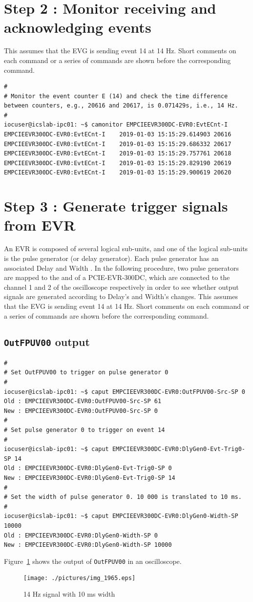 \documentclass[11pt
  , a4paper
  , article
  , oneside
  , showtrims
]{memoir}
\begin{document}
{\section{Step 2 : Monitor receiving and acknowledging events}
This assumes that the EVG is sending event 14 at 14 Hz. Short comments on each command or a series of commands are shown before the corresponding command.
\begin{lstlisting}[style=termstylenumber]
#
# Monitor the event counter E (14) and check the time difference between counters, e.g., 20616 and 20617, is 0.071429s, i.e., 14 Hz.
#
iocuser@icslab-ipc01: ~$ camonitor EMPCIEEVR300DC-EVR0:EvtECnt-I
EMPCIEEVR300DC-EVR0:EvtECnt-I    2019-01-03 15:15:29.614903 20616
EMPCIEEVR300DC-EVR0:EvtECnt-I    2019-01-03 15:15:29.686332 20617
EMPCIEEVR300DC-EVR0:EvtECnt-I    2019-01-03 15:15:29.757761 20618
EMPCIEEVR300DC-EVR0:EvtECnt-I    2019-01-03 15:15:29.829190 20619
EMPCIEEVR300DC-EVR0:EvtECnt-I    2019-01-03 15:15:29.900619 20620
\end{lstlisting}


\section{Step 3 : Generate trigger signals from EVR}
An EVR is composed of several logical sub-units, and one of the logical sub-units is the pulse generator (or delay generator). Each pulse generator has an associated Delay and Width \cite{EVR-USER-GUIDE}. In the following procedure, two pulse generators are mapped to the  and  of a PCIE-EVR-300DC, which are connected to the channel 1 and 2 of the oscilloscope respectively in order to see whether output signals are generated according to Delay's and Width's changes. This assumes that the EVG is sending event 14 at 14 Hz. Short comments on each command or a series of commands are shown before the corresponding command.

\subsection{\texttt{OutFPUV00} output}
\begin{lstlisting}[style=termstyle]
#
# Set OutFPUV00 to trigger on pulse generator 0
#
iocuser@icslab-ipc01: ~$ caput EMPCIEEVR300DC-EVR0:OutFPUV00-Src-SP 0
Old : EMPCIEEVR300DC-EVR0:OutFPUV00-Src-SP 61
New : EMPCIEEVR300DC-EVR0:OutFPUV00-Src-SP 0
#
# Set pulse generator 0 to trigger on event 14
#
iocuser@icslab-ipc01: ~$ caput EMPCIEEVR300DC-EVR0:DlyGen0-Evt-Trig0-SP 14
Old : EMPCIEEVR300DC-EVR0:DlyGen0-Evt-Trig0-SP 0
New : EMPCIEEVR300DC-EVR0:DlyGen0-Evt-Trig0-SP 14
#
# Set the width of pulse generator 0. 10 000 is translated to 10 ms.
#
iocuser@icslab-ipc01: ~$ caput EMPCIEEVR300DC-EVR0:DlyGen0-Width-SP 10000
Old : EMPCIEEVR300DC-EVR0:DlyGen0-Width-SP 0
New : EMPCIEEVR300DC-EVR0:DlyGen0-Width-SP 10000
\end{lstlisting}
Figure~\ref{fig:14Hz} shows the output of \texttt{OutFPUV00} in an oscilloscope.
\begin{figure}[!ht]
  \centering
    \texttt{[image: ./pictures/img\_1965.eps]}
  \caption{14 Hz signal with 10 ms width}
  \label{fig:14Hz}
\end{figure}

}
\end{document}
